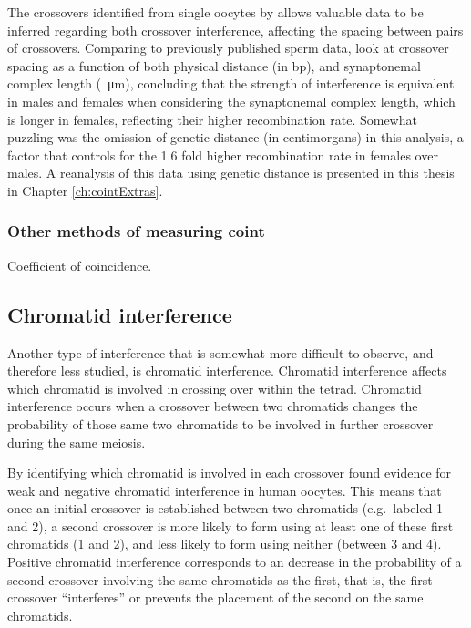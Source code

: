 The crossovers identified from single oocytes by \citet{Hou2013}
allows valuable data to be inferred regarding both crossover interference, affecting the spacing between pairs of crossovers.
Comparing to previously published sperm data\cite{Lu2012}, \citet{Hou2013} look at crossover spacing as a function of both physical distance (in bp), and synaptonemal complex length (\SI{}{\micro\metre}), concluding that the strength of interference is equivalent in males and females when considering the synaptonemal complex length, which is longer in females, reflecting their higher recombination rate.
Somewhat puzzling was the omission of genetic distance (in centimorgans) in this analysis, a factor that controls for the 1.6 fold higher recombination rate in females over males.
A reanalysis of this data using genetic distance is presented in this thesis in Chapter \ref{ch:cointExtras}.


\subsubsection{Other methods of measuring coint}
Coefficient of coincidence.

\subsection{Chromatid interference}

Another type of interference that is somewhat more difficult to observe, and therefore less studied, is chromatid interference.
Chromatid interference affects which chromatid is involved in crossing over within the tetrad.
Chromatid interference occurs when a crossover between two chromatids changes the probability of those same two chromatids to be involved in further crossover during the same meiosis.

By identifying which chromatid is involved in each crossover \citet{Hou2013} found evidence for weak and negative chromatid interference in human oocytes.
This means that once an initial crossover is established between two chromatids (e.g.\ labeled 1 and 2), a second crossover is more likely to form using at least one of these first chromatids (1 and 2), and less likely to form using neither (between 3 and 4).
Positive chromatid interference corresponds to an decrease in the probability of a second crossover involving the same chromatids as the first, that is, the first crossover ``interferes'' or prevents the placement of the second on the same chromatids.

